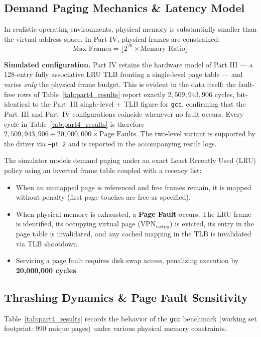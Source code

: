 \documentclass[11pt,a4paper]{article}
\begin{document}
\subsection{Demand Paging Mechanics \& Latency Model}
In realistic operating environments, physical memory is substantially smaller than the virtual address space. In Part IV, physical frames are constrained:
\begin{equation}
    \text{Max Frames} = \lfloor 2^{20} \times \text{Memory Ratio} \rfloor
\end{equation}

\noindent\textbf{Simulated configuration.}
Part IV retains the hardware model of Part III --- a 128-entry fully associative LRU TLB fronting a single-level page table --- and varies \emph{only} the physical frame budget. This is evident in the data itself: the fault-free rows of Table~\ref{tab:part4_results} report exactly $2{,}509{,}943{,}906$ cycles, bit-identical to the Part~III single-level + TLB figure for \texttt{gcc}, confirming that the Part~III and Part~IV configurations coincide whenever no fault occurs. Every cycle in Table~\ref{tab:part4_results} is therefore $2{,}509{,}943{,}906 + 20{,}000{,}000 \times \text{Page Faults}$. The two-level variant is supported by the driver via \texttt{--pt 2} and is reported in the accompanying result logs.

The simulator models demand paging under an exact Least Recently Used (LRU) policy using an inverted frame table coupled with a recency list:
\begin{itemize}
    \item When an unmapped page is referenced and free frames remain, it is mapped without penalty (first page touches are free as specified).
    \item When physical memory is exhausted, a \textbf{Page Fault} occurs. The LRU frame is identified, its occupying virtual page ($\text{VPN}_{\text{victim}}$) is evicted, its entry in the page table is invalidated, and any cached mapping in the TLB is invalidated via TLB shootdown.
    \item Servicing a page fault requires disk swap access, penalizing execution by \textbf{20,000,000 cycles}.
\end{itemize}

\subsection{Thrashing Dynamics \& Page Fault Sensitivity}
Table~\ref{tab:part4_results} records the behavior of the \texttt{gcc} benchmark (working set footprint: 990 unique pages) under various physical memory constraints.
\end{document}
